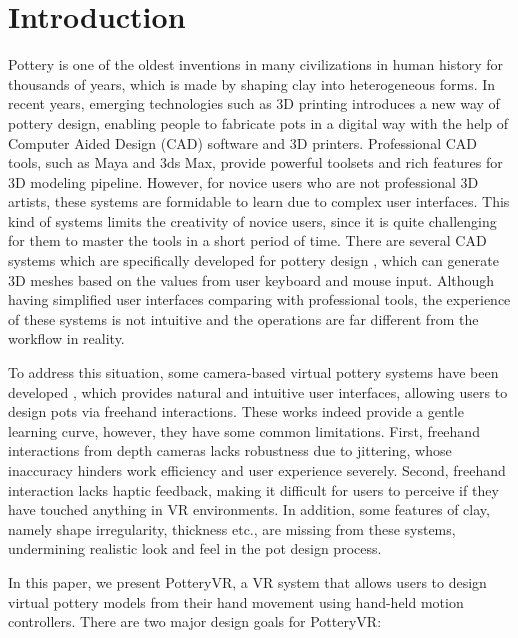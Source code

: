 \documentclass{svjour3}                     %
\begin{document}

\section{Introduction}
\label{sec:1}
Pottery is one of the oldest inventions in many civilizations in human history for thousands of years, which is made by shaping clay into heterogeneous forms.
In recent years, emerging technologies such as 3D printing introduces a new way of pottery design, enabling people to fabricate pots in a digital way with the help of Computer Aided Design (CAD) software and 3D printers.
Professional CAD tools, such as Maya\cite{website:maya} and 3ds Max\cite{website:3dmax}, provide powerful toolsets and rich features for 3D modeling pipeline.
However, for novice users who are not professional 3D artists, these systems are formidable to learn due to complex user interfaces. 
This kind of systems limits the creativity of novice users, since it is quite challenging for them to master the tools in a short period of time.
There are several CAD systems which are specifically developed for pottery design \cite{koutsoudis2009qp,kumar2011wheel}, which can generate 3D meshes based on the values from user keyboard and mouse input. Although having simplified user interfaces comparing with professional tools, the experience of these systems is not intuitive and the operations are far different from the workflow in reality.

To address this situation, some camera-based virtual pottery systems have been developed \cite{ramani2015gesture,murugappan2013handy,han2014virtual}, which provides natural and intuitive user interfaces, allowing users to design pots via freehand interactions.
These works indeed provide a gentle learning curve, however, they have some common limitations.
First, freehand interactions from depth cameras lacks robustness due to jittering, whose inaccuracy hinders work efficiency and user experience severely.
Second, freehand interaction lacks haptic feedback, making it difficult for users to perceive if they have touched anything in VR environments.
In addition, some features of clay, namely shape irregularity, thickness etc., are missing from these systems, undermining realistic look and feel in the pot design process.

In this paper, we present PotteryVR, a VR system that allows users to design virtual pottery models from their hand movement using hand-held motion controllers. There are two major design goals for PotteryVR:
\end{document}
